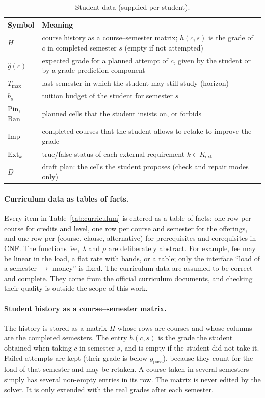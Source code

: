 \documentclass[10pt,a4paper]{article}
\begin{document}
\begin{table}[ht]
\centering
\small
\begin{tabular}{@{}p{3.1cm}>{\raggedright\arraybackslash}p{10.2cm}@{}}
\toprule
\textbf{Symbol} & \textbf{Meaning} \\
\midrule
$H$ & course history as a course--semester matrix; $h(c,s)$ is the grade of $c$ in completed semester $s$ (empty if not attempted) \\
$\hat g(c)$ & expected grade for a planned attempt of $c$, given by the student or by a grade-prediction component \\
$T_{\max}$ & last semester in which the student may still study (horizon) \\
$b_s$ & tuition budget of the student for semester $s$ \\
$\mathrm{Pin}$, $\mathrm{Ban}$ & planned cells that the student insists on, or forbids \\
$\mathrm{Imp}$ & completed courses that the student allows to retake to improve the grade \\
$\mathrm{Ext}_k$ & true/false status of each external requirement $k\in K_{\mathrm{ext}}$ \\
$D$ & draft plan: the cells the student proposes (check and repair modes only) \\
\bottomrule
\end{tabular}
\caption{Student data (supplied per student).}
\label{tab:student}
\end{table}

\paragraph{Curriculum data as tables of facts.}
Every item in Table~\ref{tab:curriculum} is entered as a table of facts: one row per course for credits and level, one row per course and semester for the offerings, and one row per (course, clause, alternative) for prerequisites and corequisites in CNF. The functions $\mathrm{fee}$, $\lambda$ and $\rho$ are deliberately abstract. For example, $\mathrm{fee}$ may be linear in the load, a flat rate with bands, or a table; only the interface ``load of a semester $\to$ money'' is fixed. The curriculum data are assumed to be
correct and complete. They come from the official curriculum documents, and checking their quality is outside the scope of this work.

\paragraph{Student history as a course--semester matrix.}
The history is stored as a matrix $H$ whose rows are courses and whose columns are the completed semesters. The entry $h(c,s)$ is the grade the student obtained when taking $c$ in semester $s$, and is empty if the student did not take it. Failed attempts are kept (their grade is below
$g_{\mathrm{pass}}$), because they count for the load of that semester and may be retaken. A course taken in several semesters simply has several non-empty entries in its row. The matrix is never edited by the solver. It is only extended with the real grades after each semester.
\end{document}
